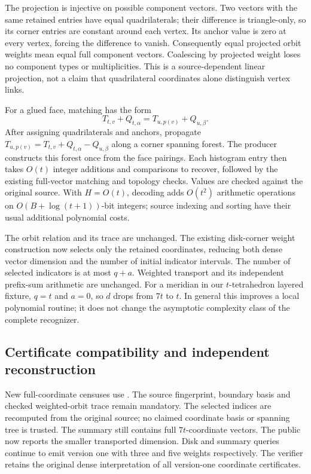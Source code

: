 The projection is injective on possible component vectors. Two vectors with
the same retained entries have equal quadrilaterals; their difference is
triangle-only, so its corner entries are constant around each vertex. Its
anchor value is zero at every vertex, forcing the difference to vanish.
Consequently equal projected orbit weights mean equal full component vectors.
Coalescing by projected weight loses no component types or multiplicities.
This is a source-dependent linear projection, not a claim that quadrilateral
coordinates alone distinguish vertex links.

For a glued face, matching has the form
\[
 T_{t,v}+Q_{t,\alpha}=T_{u,p(v)}+Q_{u,\beta}.
\]
After assigning quadrilaterals and anchors, propagate
$T_{u,p(v)}=T_{t,v}+Q_{t,\alpha}-Q_{u,\beta}$ along a corner spanning forest.
The producer constructs this forest once from the face pairings. Each
histogram entry then takes $O(t)$ integer additions and comparisons to
recover, followed by the existing full-vector matching and topology checks.
Values are checked against the original source. With $H=O(t)$, decoding
adds $O(t^2)$ arithmetic operations on $O(B+\log(t+1))$-bit integers;
source indexing and sorting have their usual additional polynomial costs.

The orbit relation and its trace are unchanged. The existing disk-corner
weight construction now selects only the retained coordinates, reducing
both dense vector dimension and the number of initial indicator intervals.
The number of selected indicators is at most $q+a$. Weighted transport and
its independent prefix-sum arithmetic are unchanged. For a meridian in our
$t$-tetrahedron layered fixture, $q=t$ and $a=0$, so $d$ drops from $7t$ to
$t$. In general this improves a local polynomial routine; it does not change
the asymptotic complexity class of the complete recognizer.

\subsection{Certificate compatibility and independent reconstruction}

New full-coordinate censuses use .
The source fingerprint, boundary basis and checked weighted-orbit trace
remain mandatory. The selected indices are recomputed from the original
source; no claimed coordinate basis or spanning tree is trusted. The
summary still contains full $7t$-coordinate vectors. The public
 now reports the smaller transported dimension.
Disk and summary queries continue to emit version one with three and five
weights respectively. The verifier retains the original dense interpretation
of all version-one coordinate certificates.


